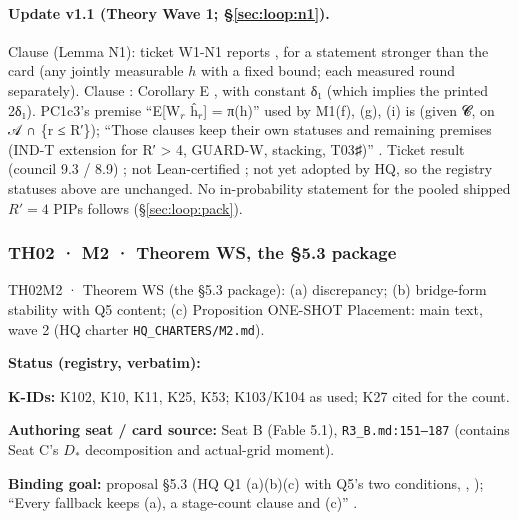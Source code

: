 \paragraph{Update v1.1 (Theory Wave 1; \S\ref{sec:loop:n1}).} Clause  (Lemma N1): ticket W1-N1 reports , for a statement stronger than the card (any jointly measurable $h$ with a fixed bound; each measured round separately). Clause : Corollary E , with constant δ₁ (which implies the printed 2δ₁). PC1c3's premise ``E[W$_{r}$ ĥ$_{r}$] = π(h)'' used by M1(f), (g), (i) is  (given 𝓒, on 𝒜 ∩ \{r ≤ R′\}); ``Those clauses keep their own statuses and remaining premises (IND-T extension for R′ > 4, GUARD-W, stacking, T03♯)'' . Ticket result  (council 9.3 / 8.9) ; not Lean-certified ; not yet adopted by HQ, so the registry statuses above are unchanged. No in-probability statement for the pooled shipped $R'=4$ PIPs follows (\S\ref{sec:loop:pack}).

\subsubsection{TH02 · M2 · Theorem WS, the §5.3 package}\label{sec:th02}
\begin{card}{TH02}{M2 · Theorem WS (the §5.3 package): (a) discrepancy; (b) bridge-form stability with Q5 content; (c) Proposition ONE-SHOT}
\approvedFB\quad Placement: main text, wave 2 (HQ charter \texttt{HQ\_CHARTERS/M2.md}).\par
\textbf{Status (registry, verbatim):} \par
\textbf{K-IDs:} K102, K10, K11, K25, K53; K103/K104 as used; K27 cited for the count.\par
\textbf{Authoring seat / card source:} Seat B (Fable 5.1), \texttt{R3\_B.md:151–187} (contains Seat C's $D_{*}$ decomposition and actual-grid moment).\par
\textbf{Binding goal:} proposal §5.3 (HQ Q1 (a)(b)(c) with Q5's two conditions, , ); ``Every fallback keeps (a), a stage-count clause and (c)'' .
\end{card}

